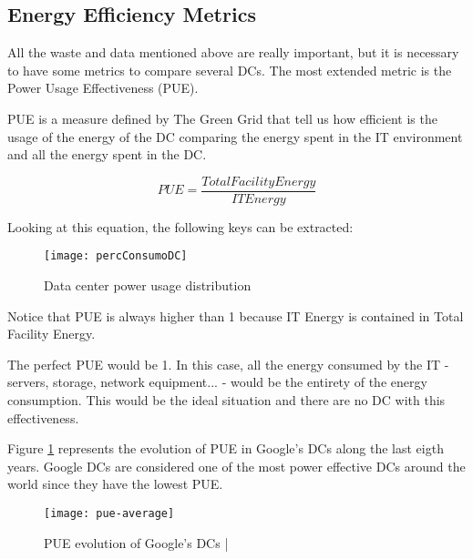 \subsection{Energy Efficiency Metrics}


All the waste and data mentioned above are really important, but it is necessary to have some metrics to compare several DCs. The most extended metric is the Power Usage Effectiveness (PUE).

PUE is a measure defined by The Green Grid that tell us how efficient is the usage of the energy of the DC comparing the energy spent in the IT environment and all the energy spent in the DC. \cite{originalPUE}
 

\begin{equation*}
PUE = \frac{Total Facility Energy}{IT Energy}
\end{equation*}

Looking at this equation, the following keys can be extracted:

\begin{wrapfigure}{l}{0.5\textwidth}
    \centering
    \texttt{[image: percConsumoDC]}
    \caption{Data center power usage distribution}

\end{wrapfigure}



Notice that PUE is always higher than 1 because IT Energy is contained in Total Facility Energy.

The perfect PUE would be 1. In this case, all the energy consumed  by the IT - servers, storage, network equipment... - would be the entirety of the energy consumption. This would be the ideal situation and there are no DC with this effectiveness.

Figure \ref{fig:pue-average} represents the evolution of PUE in Google's DCs along the last eigth years. Google DCs are considered one of the most power effective DCs around the world since they have the lowest PUE.

\begin{figure}[h]
\texttt{[image: pue-average]} %
\caption{PUE evolution of Google's DCs |\cite{puegrafica}}
\label{fig:pue-average} %
\end{figure}

